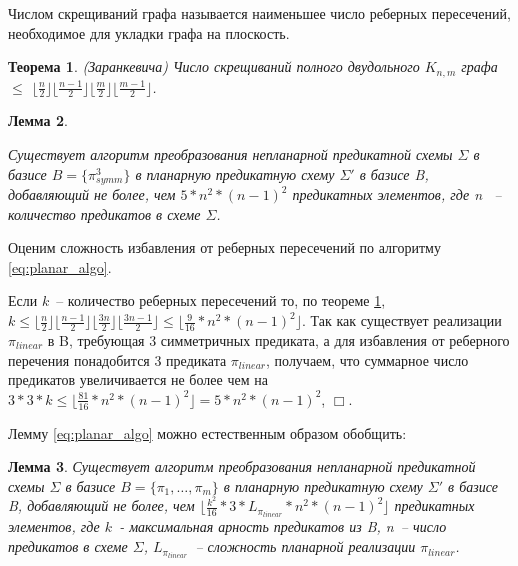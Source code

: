 \documentclass[12pt]{article}
\newtheorem{theorem}{Теорема}[section]
\newtheorem{lemma}[theorem]{Лемма}
\newenvironment{proof}[1][Доказательство]{\begin{trivlist}
\item[\hskip \labelsep {\bfseries #1}]}{\end{trivlist}}
\newenvironment{definition}[1][Определение]{\begin{trivlist}
\item[\hskip \labelsep {\bfseries #1}]}{\end{trivlist}}
\begin{document}
\begin{definition}
Числом скрещиваний графа называется наименьшее число реберных пересечений, необходимое для укладки графа на плоскость.
\end{definition}

\begin{theorem}
\label{ZarankTheorem}
(Заранкевича) Число скрещиваний полного двудольного $K_{n,m}$ графа $\leq$
$\lfloor \frac{n}{2} \rfloor \lfloor \frac{n-1}{2} \rfloor \lfloor \frac{m}{2} \rfloor \lfloor \frac{m-1}{2} \rfloor$.
\cite{Zarank54}
\end{theorem}

\begin{lemma}
\label{eq:planar_algo_complexity}

Существует алгоритм преобразования непланарной предикатной схемы $\Sigma$ в базисе $B=\{\pi_{symm}^3\}$
в планарную предикатную схему $\Sigma'$ в базисе B, добавляющий не более, чем 
$5 * n^2*(n-1)^2 $ предикатных элементов, где n ~-- количество предикатов в схеме $\Sigma$.
\end{lemma}

\begin{proof}
Оценим сложность избавления от реберных пересечений по алгоритму \ref{eq:planar_algo}.

Если $k$~-- количество реберных пересечений то, по теореме \ref{ZarankTheorem}, 
$k \leq \lfloor \frac{n}{2} \rfloor \lfloor \frac{n-1}{2} \rfloor \lfloor \frac{3n}{2} \rfloor \lfloor \frac{3n-1}{2} \rfloor \le \lfloor \frac{9}{16} * n^2*(n-1)^2 \rfloor$.
Так как существует реализации $\pi_{linear}$ в B, требующая 3 симметричных предиката, а для избавления
от реберного перечения понадобится 3 предиката $\pi_{linear}$, получаем, 
что суммарное число предикатов увеличивается не более чем на
$3*3*k \leq \lfloor \frac{81}{16} * n^2 * (n-1)^2 \rfloor = 5 * n^2 * (n-1)^2$, $\Box$.
\end{proof}

Лемму \ref{eq:planar_algo} можно естественным образом обобщить:
\begin{lemma}
\label{general_planar_algo_complexity}
Существует алгоритм преобразования непланарной предикатной схемы $\Sigma$ в базисе $B = \{\pi_1, \dots, \pi_m \}$
в планарную предикатную схему $\Sigma'$ в базисе B, добавляющий не более, чем $\lfloor \frac{k^2}{16} * 3 * L_{\pi_{linear}} * n^2*(n-1)^2 \rfloor$ 
предикатных элементов, где $k$~- максимальная арность предикатов из B, n~-- число предикатов в схеме $\Sigma$, 
$L_{\pi_{linear}}$~-- сложность планарной реализации $\pi_{linear}$.
\end{lemma}
\end{document}
